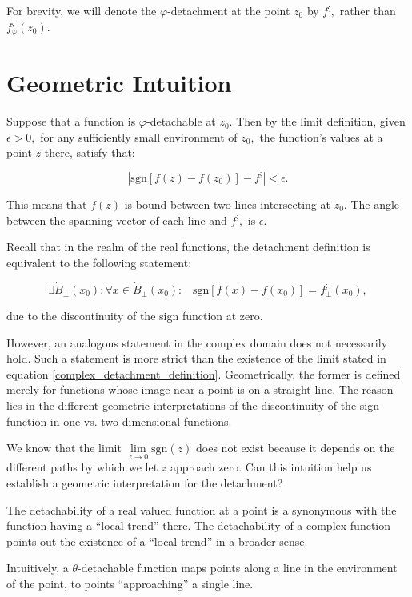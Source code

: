 \documentclass[11pt]{book}
\begin{document}
For brevity, we will denote the $\varphi$-detachment at the point $z_{0}$ by $f^{;},$ rather than $f_{\varphi}^{;}\left(z_{0}\right)$.

\section{Geometric Intuition}
Suppose that a function is $\varphi$-detachable at $z_{0}.$ Then by the limit definition, given $\epsilon>0,$ for any sufficiently small environment of $z_{0},$ the function's values at a point $z$ there, satisfy that:

$$\left|\text{sgn}\left[f\left(z\right)-f\left(z_{0}\right)\right]-f^{;}\right|<\epsilon.$$

This means that $f\left(z\right)$ is bound between two lines intersecting at $z_{0}.$ The angle between the spanning vector of each line and $f^{;},$ is $\epsilon.$

Recall that in the realm of the real functions, the detachment definition is equivalent to the following statement:

$$\exists\dot{B}_{\pm}\left(x_{0}\right):\forall x\in\dot{B}_{\pm}\left(x_{0}\right):\,\,\,\,\,\text{sgn}\left[f\left(x\right)-f\left(x_{0}\right)\right]=f_{\pm}^{;}\left(x_{0}\right),$$

due to the discontinuity of the sign function at zero.

However, an analogous statement in the complex domain does not necessarily hold. Such a statement is more strict than the existence of the limit stated in equation \ref{complex_detachment_definition}. Geometrically, the former is defined merely for functions whose image near a point is on a straight line. The reason lies in the different geometric interpretations of the discontinuity of the sign function in one vs. two dimensional functions.

We know that the limit $\underset{z\to0}{\lim}\text{sgn}\left(z\right)$ does not exist because it depends on the different paths by which we let $z$ approach zero. Can this intuition help us establish a geometric interpretation for the detachment?

The detachability of a real valued function at a point is a synonymous with the function having a “local trend” there. The detachability of a complex function points out the existence of a “local trend” in a broader sense.

Intuitively, a $\theta$-detachable function maps points along a line in the environment of the point, to points “approaching” a single line.
\end{document}
